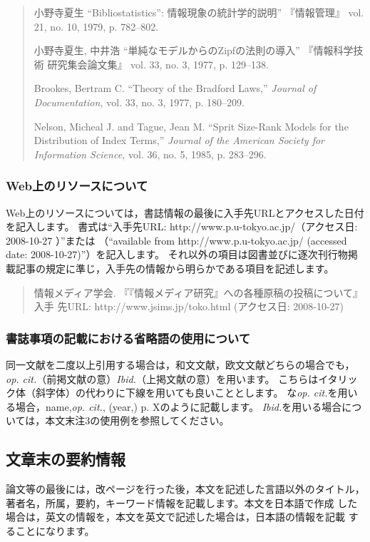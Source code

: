 \documentclass[b5paper,10pt,twocolumn,tombow]{jarticle}
\begin{document}
\begin{quote}
小野寺夏生 ``Bibliostatistics'': 情報現象の統計学的説明'' 『情報管理』
 vol. 21, no. 10, 1979, p. 782--802.

小野寺夏生, 中井浩 ``単純なモデルからのZipfの法則の導入'' 『情報科学技術
 研究集会論文集』 vol. 33, no. 3, 1977, p. 129--138.

Brookes, Bertram C. ``Theory of the Bradford Laws,'' \textit{Journal of
 Documentation,} vol. 33, no. 3, 1977, p. 180--209.

Nelson, Micheal J. and Tague, Jean M. ``Sprit Size-Rank Models for the
 Distribution of Index Terms,'' \textit{Journal of the American Society
 for Information Science,} vol. 36, no. 5, 1985, p. 283--296.
\end{quote}

\subsubsection{Web上のリソースについて}
Web上のリソースについては，書誌情報の最後に入手先URLとアクセスした日付を記入します。
書式は``入手先URL: http://www.p.u-tokyo.ac.jp/（アクセス日: 2008-10-27 ）''または
（``available from http://www.p.u-tokyo.ac.jp/ (accessed date: 2008-10-27)''）を記入します。
それ以外の項目は図書並びに逐次刊行物掲載記事の規定に準じ，入手先の情報から明らかである項目を記述します。

\begin{quote}
 情報メディア学会. 『『情報メディア研究』への各種原稿の投稿について』 入手
 先URL: http://www.jsims.jp/toko.html (アクセス日: 2008-10-27)
\end{quote}

\subsubsection{書誌事項の記載における省略語の使用について}

同一文献を二度以上引用する場合は，和文文献，欧文文献どちらの場合でも，
\textit{op. cit.}（前掲文献の意）\textit{Ibid.}（上掲文献の意）を用います。
こちらはイタリック体（斜字体）の代わりに下線を用いても良いこととします。
な\textit{op. cit.}を用いる場合，name,\textit{op. cit.}, (year,) p. Xのように記載します。
\textit{Ibid.}を用いる場合については，本文末注3の使用例を参照してください。


\subsection{文章末の要約情報}
論文等の最後には，改ページを行った後，本文を記述した言語以外のタイトル，
著者名，所属，要約，キーワード情報を記載します。本文を日本語で作成
した場合は，英文の情報を，本文を英文で記述した場合は，日本語の情報を記載
することになります。
\end{document}
